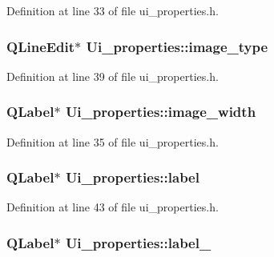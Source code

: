 Definition at line 33 of file ui\_\-properties.h.

\hypertarget{classUi__properties_adcc106f28130b1fd13a84ef061ac36b6}{
\subsubsection[{image\_\-type}]{\setlength{\rightskip}{0pt plus 5cm}QLineEdit$\ast$ {\bf Ui\_\-properties::image\_\-type}}}
\label{classUi__properties_adcc106f28130b1fd13a84ef061ac36b6}


Definition at line 39 of file ui\_\-properties.h.

\hypertarget{classUi__properties_a6cb30319918b6af8d51132c79d6dcc23}{
\subsubsection[{image\_\-width}]{\setlength{\rightskip}{0pt plus 5cm}QLabel$\ast$ {\bf Ui\_\-properties::image\_\-width}}}
\label{classUi__properties_a6cb30319918b6af8d51132c79d6dcc23}


Definition at line 35 of file ui\_\-properties.h.

\hypertarget{classUi__properties_ac89da5db2b698990b8f75f2f1f1ac43b}{
\subsubsection[{label}]{\setlength{\rightskip}{0pt plus 5cm}QLabel$\ast$ {\bf Ui\_\-properties::label}}}
\label{classUi__properties_ac89da5db2b698990b8f75f2f1f1ac43b}


Definition at line 43 of file ui\_\-properties.h.

\hypertarget{classUi__properties_a1376b8960298c79c539abb1cc5446743}{
\subsubsection[{label\_\-2}]{\setlength{\rightskip}{0pt plus 5cm}QLabel$\ast$ {\bf Ui\_\-properties::label\_}}}
\label{classUi__properties_a1376b8960298c79c539abb1cc5446743}


